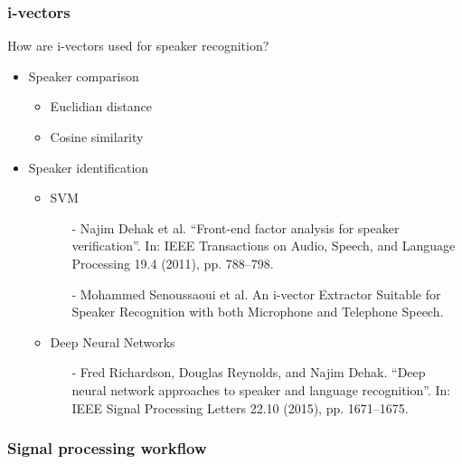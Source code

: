 \documentclass[11pt,english]{beamer}
\begin{document}
\begin{frame}
  \frametitle{i-vectors}
    How are i-vectors used for speaker recognition?
    \begin{itemize}
    \item Speaker comparison
      \begin{itemize}
      \item Euclidian distance
      \item Cosine similarity
      \end{itemize}
    \item Speaker identification
      \begin{itemize}
    \item SVM 
        \begin{itemize}
        \item[-] \footnotesize  Najim Dehak et al. “Front-end factor analysis for speaker verification”. In: IEEE Transactions on Audio, Speech, and Language Processing 19.4 (2011), pp. 788–798.
        \item[-] \footnotesize  Mohammed Senoussaoui et al. An i-vector Extractor Suitable for Speaker Recognition with both Microphone and Telephone Speech.
        \end{itemize}
      \item Deep Neural Networks
        \begin{itemize}
        \item[-] \footnotesize Fred Richardson, Douglas Reynolds, and Najim Dehak. “Deep neural network approaches to speaker and language recognition”. In: IEEE Signal Processing Letters 22.10 (2015), pp. 1671–1675.  
        \end{itemize}
      \end{itemize}
    \end{itemize}
    


\end{frame}

\begin{frame}
  \frametitle{Signal processing workflow}
    \centering
\end{frame}
\end{document}
